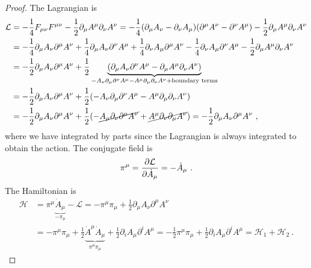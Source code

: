     \begin{proof}
        The Lagrangian is
        \begin{equation*}
        \begin{aligned}
            \mathcal L & = - \frac{1}{4} F_{\mu\nu} F^{\mu\nu} - \frac{1}{2} \partial_\mu A^\mu \partial_\nu A^\nu = - \frac{1}{4} (\partial_\mu A_\nu - \partial_\nu A_\mu) (\partial^\mu A^\nu - \partial^\nu A^\mu) - \frac{1}{2} \partial_\mu A^\mu \partial_\nu A^\nu \\ & = - \frac{1}{4} \partial_\mu A_\nu \partial^\mu A^\nu + \frac{1}{4} \partial_\mu A_\nu \partial^\nu A^\mu + \frac{1}{4} \partial_\nu A_\mu \partial^\mu A^\nu - \frac{1}{4} \partial_\nu A_\mu \partial^\nu A^\mu - \frac{1}{2} \partial_\mu A^\mu \partial_\nu A^\nu \\ & = - \frac{1}{2} \partial_\mu A_\nu \partial^\mu A^\nu + \frac{1}{2} \underbrace{(\partial_\mu A_\nu \partial^\nu A^\mu - \partial_\mu A^\mu \partial_\nu A^\nu) }_{ - A_\nu  \partial_\mu \partial^\nu A^\mu - A^\mu \partial_\mu \partial_\nu A^\nu + \textnormal{boundary terms}} \\ & = - \frac{1}{2} \partial_\mu A_\nu \partial^\mu A^\nu + \frac{1}{2} (- A_\nu  \partial_\mu \partial^\nu A^\mu - A^\mu \partial_\mu \partial_\nu A^\nu) \\ & = - \frac{1}{2} \partial_\mu A_\nu \partial^\mu A^\nu + \frac{1}{2} (- \cancel{A_\mu  \partial_\nu \partial^\mu A^\nu} + \cancel{A^\mu \partial_\nu \partial_\mu A^\nu}) = - \frac{1}{2} \partial_\mu A_\nu \partial^\mu A^\nu ~,
        \end{aligned}
        \end{equation*}
        where we have integrated by parts since the Lagrangian is always integrated to obtain the action. The conjugate field is 
        \begin{equation*}
            \pi^\mu = \frac{\partial\mathcal L}{\partial\dot A_\mu} = - \dot A_\mu ~.
        \end{equation*}
        The Hamiltonian is 
        \begin{equation*}
        \begin{aligned}
            \mathcal H & = \pi^\mu \underbrace{\dot A_\mu}_{- \pi_\mu} - \mathcal L = - \pi^\mu \pi_\mu + \frac{1}{2} \partial_\mu A_\nu \partial^\mu A^\nu \\ & = - \pi^\mu \pi_\mu + \frac{1}{2} \underbrace{\dot A^\mu \dot A_\mu}_{\pi^\mu \pi_\mu} + \frac{1}{2} \partial_i A_\mu \partial^i A^\mu = - \frac{1}{2} \pi^\mu \pi_\mu + \frac{1}{2} \partial_i A_\mu \partial^i A^\mu = \mathcal H_1 + \mathcal H_2 ~.

\end{aligned}
\end{equation*}
\end{proof}
